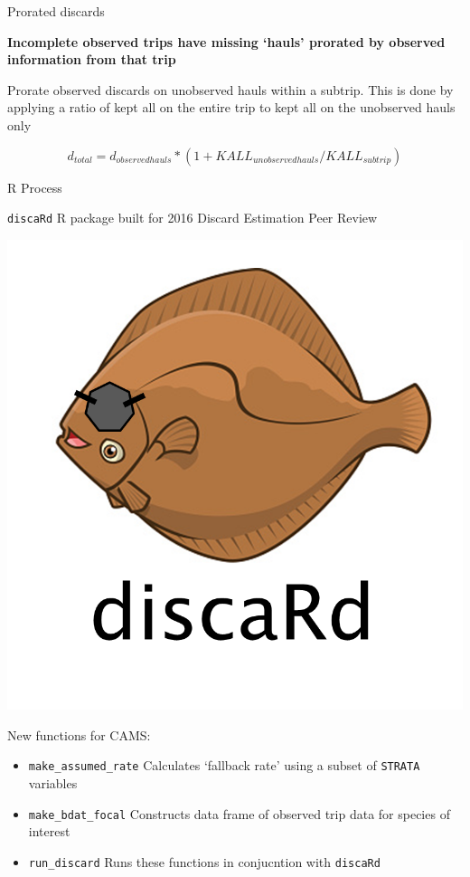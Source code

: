 \documentclass[
  ignorenonframetext,
]{beamer}
\providecommand{\tightlist}{%
  \setlength{\itemsep}{0pt}\setlength{\parskip}{0pt}}
\begin{document}
\begin{frame}{Prorated discards}
\protect\hypertarget{prorated-discards}{}

\textbf{Incomplete observed trips have missing `hauls' prorated by
observed information from that trip}

Prorate observed discards on unobserved hauls within a subtrip. This is
done by applying a ratio of kept all on the entire trip to kept all on
the unobserved hauls only

\[d_{total} = d_{observedhauls}*(1+KALL_{unobserved hauls}/KALL_{subtrip})\]

\end{frame}

\begin{frame}[fragile]{R Process}
\protect\hypertarget{r-process}{}

\texttt{discaRd} R package built for 2016 Discard Estimation Peer Review

\includegraphics[width = .25\textwidth, height = .25\textheight]{discaRd.png}

New functions for CAMS:

\begin{itemize}
\tightlist
\item
  \texttt{make\_assumed\_rate} Calculates `fallback rate' using a subset
  of \texttt{STRATA} variables
\item
  \texttt{make\_bdat\_focal} Constructs data frame of observed trip data
  for species of interest
\item
  \texttt{run\_discard} Runs these functions in conjucntion with
  \texttt{discaRd}
\end{itemize}

\end{frame}
\end{document}
